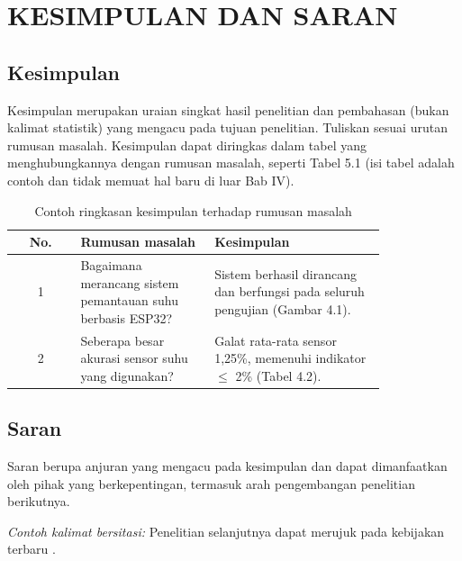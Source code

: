 \chapter{KESIMPULAN DAN SARAN}

\section{Kesimpulan}
Kesimpulan merupakan uraian singkat hasil penelitian dan pembahasan (bukan kalimat statistik) yang mengacu pada tujuan penelitian. Tuliskan sesuai urutan rumusan masalah. Kesimpulan dapat diringkas dalam tabel yang menghubungkannya dengan rumusan masalah, seperti Tabel 5.1 (isi tabel adalah contoh dan tidak memuat hal baru di luar Bab IV).

\begin{singlespace}
\begin{longtable}{|c|p{0.36\linewidth}|p{0.46\linewidth}|}
\caption{Contoh ringkasan kesimpulan terhadap rumusan masalah}\\
\hline
\textbf{No.} & \textbf{Rumusan masalah} & \textbf{Kesimpulan} \\
\hline
1 & Bagaimana merancang sistem pemantauan suhu berbasis ESP32? & Sistem berhasil dirancang dan berfungsi pada seluruh pengujian (Gambar 4.1). \\
\hline
2 & Seberapa besar akurasi sensor suhu yang digunakan? & Galat rata-rata sensor 1,25\%, memenuhi indikator $\leq$ 2\% (Tabel 4.2). \\
\hline
\end{longtable}
\end{singlespace}

\section{Saran}
Saran berupa anjuran yang mengacu pada kesimpulan dan dapat dimanfaatkan oleh pihak yang berkepentingan, termasuk arah pengembangan penelitian berikutnya.

\textit{Contoh kalimat bersitasi:} Penelitian selanjutnya dapat merujuk pada kebijakan terbaru \parencite{komdigi2025}.
